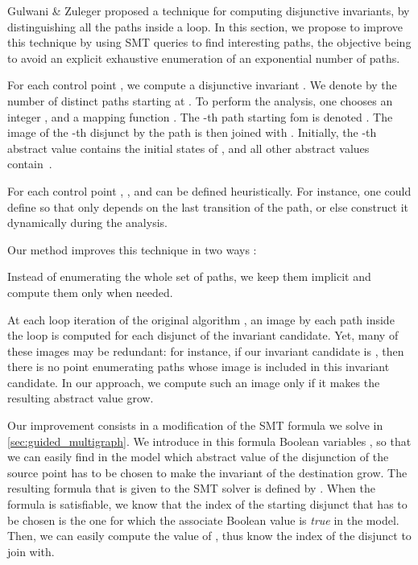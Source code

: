 Gulwani \& Zuleger \cite{DBLP:conf/pldi/GulwaniZ10} proposed a technique for computing disjunctive invariants, by
distinguishing all the paths inside a loop. In
this section, we propose to improve this technique by using SMT queries to find
interesting paths, the objective being to avoid an explicit exhaustive
enumeration of an exponential number of paths.

For each control point , we compute a disjunctive invariant
. We denote by  the number of
distinct paths starting at .
To perform the analysis, one chooses an integer , and
a mapping function .
  The -th path starting fom  is denoted .
  The image of the -th disjunct  by the path  is then
  joined with .
Initially, the -th abstract value contains the initial states of
, and all other abstract values contain~.

For each control point , ,  and  can be defined heuristically.
For instance, one could define  so that  only depends on the
last transition of the path, or else construct it dynamically during the
analysis.

Our method improves this technique in two ways :
\begin{compactitem}
\item Instead of enumerating the whole set of paths, we keep them implicit and
compute them only when needed.

\item At each loop iteration of the original algorithm \cite{DBLP:conf/pldi/GulwaniZ10}, an image by each path inside the loop is computed for each disjunct of the invariant candidate.
Yet, many of these images may be redundant: for instance, if our invariant candidate is , then there is no point enumerating paths whose image is included in this invariant candidate.
In our approach, we compute such an image only if it makes the resulting abstract value grow.
\end{compactitem}

Our improvement consists in a modification of the SMT formula we solve in
\ref{sec:guided_multigraph}.
We introduce in this formula Boolean variables , so
that we can easily find in the model which abstract value of the
disjunction of the source point has
to be chosen to make the invariant of the destination grow.
The resulting formula that is given to the SMT solver is defined
by .
When the formula is satisfiable, we know that the index  of the starting
disjunct that has to be chosen is the one for which the associate Boolean value
 is \emph{true} in the model. Then, we can easily compute the value of 
, thus know the index of the disjunct to join with.


